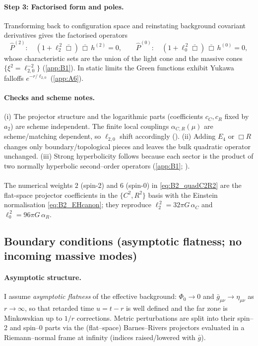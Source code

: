 \documentclass{iopjournal}
\begin{document}
\paragraph{Step 3: Factorised form and poles.}
Transforming back to configuration space and reinstating background covariant derivatives gives the factorised operators
\[
\widehat P^{(2)}:\quad (1+\ell_2^{\,2}\bar\Box)\,\bar\Box\,h^{(2)}=0,
\qquad
\widehat P^{(0)}:\quad (1+\ell_0^{\,2}\bar\Box)\,\bar\Box\,h^{(0)}=0,
\]
whose characteristic sets are the union of the light cone and the massive cones
$\{\xi^2=\ell_{2,0}^{-2}\}$ (\cref{app:B1}). In static limits the Green functions exhibit Yukawa falloffs $e^{-r/\ell_{2,0}}$ (\cref{app:A6}).

\paragraph{Checks and scheme notes.}
(i) The projector structure and the logarithmic parts (coefficients $c_{C},c_{R}$ fixed by $a_2$) are scheme independent. The finite local couplings $\alpha_{C,R}(\mu)$ are scheme/matching dependent, so $\ell_{2,0}$ shift accordingly ().
(ii) Adding $E_4$ or $\Box R$ changes only boundary/topological pieces and leaves the bulk quadratic operator unchanged.
(iii) Strong hyperbolicity follows because each sector is the product of two normally hyperbolic second–order operators (\cref{app:B1}; \cite{BGV2007}).

\paragraph{}
    The numerical weights $2$ (spin-2) and $6$ (spin-0) in \eqref{eq:B2_quadC2R2} are the
flat-space projector coefficients in the $\{C^2,R^2\}$ basis with the Einstein normalisation
\eqref{eq:B2_EHcanon}; they reproduce $\ell_2^{\,2}=32\pi G\,\alpha_C$ and $\ell_0^{\,2}=96\pi G\,\alpha_R$.


\subsection{Boundary conditions (asymptotic flatness; no incoming massive modes)} \label{app:B4}
\paragraph{Asymptotic structure.}
I assume \emph{asymptotic flatness} of the effective background: $\Phi_0\!\to\!0$ and $\bar g_{\mu\nu}\!\to\!\eta_{\mu\nu}$ as $r\to\infty$, so that retarded time $u=t-r$ is well defined and the far zone is Minkowskian up to $1/r$ corrections. Metric perturbations are split into their spin–2 and spin–0 parts via the (flat–space) Barnes–Rivers projectors evaluated in a Riemann–normal frame at infinity (indices raised/lowered with $\bar g$).
\end{document}
